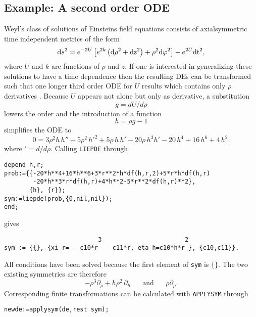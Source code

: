 \subsection{Example: A second order ODE}
Weyl's class of solutions of Einsteins field equations consists of
axialsymmetric time independent metrics of the form
\begin{equation}
{\rm{d}} s^2 = e^{-2 U} \left[ e^{2 k}  \left( \rm{d} \rho^2 + \rm{d}
z^2 \right)+\rho^2 \rm{d} \varphi^2 \right] - e^{2 U} \rm{d} t^2,
\end{equation}
where $U$ and $k$ are functions of $\rho$ and $z$. If one is interested in
generalizing these solutions to have a time dependence then the resulting
DEs can be transformed such that one longer third order ODE for $U$ results
which contains only $\rho$ derivatives \cite{Markus}. Because $U$ appears
not alone but only as derivative, a substitution
\begin{equation}
g = dU/d\rho      \label{g1dgl}
\end{equation}
lowers the order and the introduction of a function
\begin{equation}
h = \rho g - 1    \label{g2dgl}
\end{equation}
simplifies the ODE to
\begin{equation}
0 = 3\rho^2h\,h''
-5\rho^2\,h'^2+5\rho\,h\,h'-20\rho\,h^3h'-20\,h^4+16\,h^6+4\,h^2. \label{hdgl}
\end{equation}
where $'= d/d\rho$.
Calling {\tt LIEPDE} through
\small \begin{verbatim}
depend h,r;
prob:={{-20*h**4+16*h**6+3*r**2*h*df(h,r,2)+5*r*h*df(h,r)
        -20*h**3*r*df(h,r)+4*h**2-5*r**2*df(h,r)**2},
       {h}, {r}};
sym:=liepde(prob,{0,nil,nil});
end; \end{verbatim} \normalsize
gives \small \begin{verbatim}
                          3                       2
sym := {{}, {xi_r= - c10*r  - c11*r, eta_h=c10*h*r }, {c10,c11}}.
\end{verbatim} \normalsize
All conditions have been solved because the first element of {\tt sym}
is $\{\}$. The two existing symmetries are therefore
\begin{equation}
  - \rho^3 \partial_{\rho} +  h \rho^2 \,\partial_{h} \;\;\;\;\;\;\mbox{and}
  \;\;\;\;\;\;\rho \partial_{\rho}.
\end{equation}
Corresponding finite
transformations can be calculated with {\tt APPLYSYM} through
\small \begin{verbatim}
newde:=applysym(de,rest sym);
\end{verbatim} \normalsize
